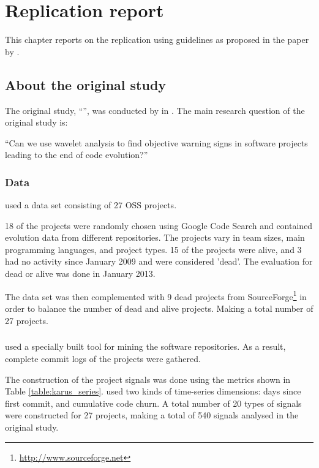 \chapter{Replication report}
\label{replication}

This chapter reports on the replication using guidelines as proposed in the
paper by \citet{carver}.

\section*{About the original study}
The original study, ``\repltitle{}'', was conducted by \replauthor{} in
\citeyear{karus2013}. The main research question of the original study is:

``Can we use wavelet analysis to find objective warning signs in software
projects leading to the end of code evolution?''

\subsection*{Data}
\citeauthor{karus2013} used a data set consisting of 27 OSS projects.

18 of the projects were randomly chosen using Google Code Search and contained
evolution data from different repositories. The projects vary in team sizes,
main programming languages, and project types. 15 of the projects were alive,
and 3 had no activity since January 2009 and were considered 'dead'. The
evaluation for dead or alive was done in January 2013.

The data set was then complemented with 9 dead projects from
SourceForge\footnote{\url{http://www.sourceforge.net}} in order to balance the
number of dead and alive projects. Making a total number of 27 projects.

\paragraph{}
\citeauthor{karus2013} used a specially built tool for mining the software
repositories. As a result, complete commit logs of the projects were gathered.

The construction of the project signals was done using the metrics shown in
Table \ref{table:karus_series}. \citeauthor{karus2013} used two kinds of
time-series dimensions: days since first commit, and cumulative code churn. A
total number of 20 types of signals were constructed for 27 projects, making a
total of 540 signals analysed in the original study.

